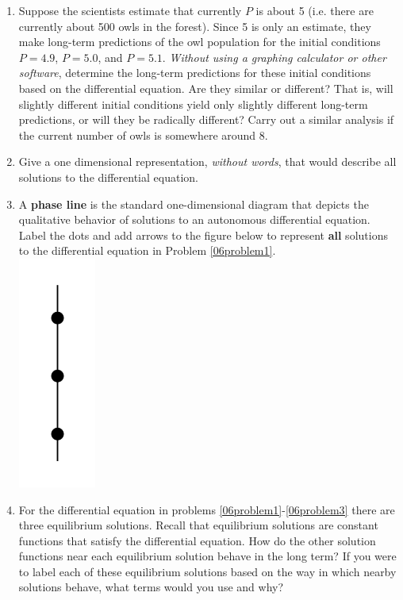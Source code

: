 \begin{enumerate}
\item Suppose the scientists estimate that currently $P$ is about 5 (i.e. there are currently about 500 owls in the forest).  Since 5 is only an estimate, they make long-term predictions of the owl population for the initial conditions $P = 4.9$, $P = 5.0$, and $P = 5.1$. \textit{Without using a graphing calculator or other software}, determine the long-term predictions for these initial conditions based on the differential equation. Are they similar or different?  That is, will slightly different initial conditions yield only slightly different long-term predictions, or will they be radically different? Carry out a similar analysis if the current number of owls is somewhere around 8.\label{06problem1}
\vspace{4in}

\item Give a one dimensional representation, \textit{without words}, that would describe all solutions to the differential equation. \label{06problem2}

\clearpage
\item A \textbf{phase line} is the standard one-dimensional diagram that depicts the qualitative behavior of solutions to an autonomous differential equation. Label the dots and add arrows to the figure below to represent \textbf{all} solutions to the differential equation in Problem \ref{06problem1}. \label{06problem3} \\
\includegraphics[width=1in]{06/06PhaseLine.png}

\item For the differential equation in problems \ref{06problem1}-\ref{06problem3} there are three equilibrium solutions. Recall that equilibrium solutions are constant functions that satisfy the differential equation. How do the other solution functions near each equilibrium solution behave in the long term? If you were to label each of these equilibrium solutions based on the way in which nearby solutions behave, what terms would you use and why? \label{06problem4} 

\end{enumerate}

